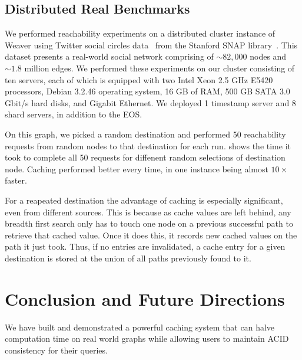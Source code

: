 \documentclass[letterpaper,twocolumn,11pt,tight]{article}
\begin{document}
\subsection{Distributed Real Benchmarks}
We performed reachability experiments on a distributed cluster instance of Weaver using Twitter social circles data~\cite{twitter_data} from the Stanford SNAP library~\cite{snap}.
This dataset presents a real-world social network comprising of $\sim 82,000$ nodes and $\sim 1.8$ million edges.
We performed these experiments on our cluster consisting of ten
    servers, each of which is equipped with two Intel Xeon 2.5 GHz E5420 processors, Debian 3.2.46 operating system, 16 GB of RAM, 500 GB SATA 3.0 Gbit/s hard disks, and Gigabit Ethernet.
We deployed 1 timestamp server and 8 shard servers, in addition to the EOS.

On this graph, we picked a random destination and performed 50 reachability requests from random nodes to that destination for each run.  shows the time it took to complete all 50 requests for diffenent random selections of destination node. Caching performed better every time, in one instance being almost $10\times$ faster.

For a reapeated destination the advantage of caching is especially significant, even from different sources. This is because as cache values are left behind, any breadth first search only has to touch one node on a previous successful path to retrieve that cached value. Once it does this, it records new cached values on the path it just took. Thus, if no entries are invalidated, a cache entry for a given destination is stored at the union of all paths previously found to it.


\section{Conclusion and Future Directions}\label{sec:conclusion}
We have built and demonstrated a powerful caching system that can halve computation time on real world graphs while allowing users to maintain ACID consistency for their queries.
\end{document}
